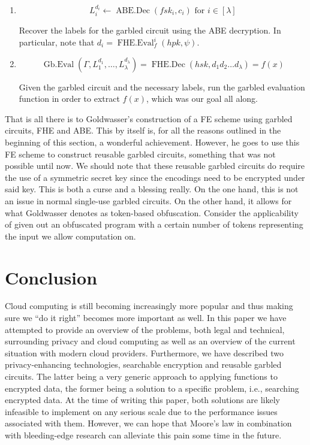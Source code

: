 \documentclass[11pt, a4paper]{article}
\newcommand{\op}[1]{\operatorname{#1}}
\begin{document}
\begin{enumerate}
    \item
        \[
            L_i^{d_i} \gets \op{ABE.Dec}(fsk_i, c_i) \text{ for } i \in [\lambda]
        \]

        Recover the labels for the garbled circuit using the ABE decryption. In particular, note that $d_i = \op{FHE.Eval}_f^i(hpk, \psi)$.
    \item
        \[
            \op{Gb.Eval}(\Gamma, L_1^{d_1}, \dots, L_{\lambda}^{d_{\lambda}}) = \op{FHE.Dec}(hsk, d_1 d_2 \dots d_{\lambda}) = f(x)
        \]

        Given the garbled circuit and the necessary labels, run the garbled evaluation function in order to extract $f(x)$, which was our goal all along.
\end{enumerate}

That is all there is to Goldwasser's construction of a FE scheme using garbled circuits, FHE and ABE. 
This by itself is, for all the reasons outlined in the beginning of this section, a wonderful achievement. 
However, he goes to use this FE scheme to construct reusable garbled circuits, something that was not possible until now.
We should note that these reusable garbled circuits do require the use of a symmetric secret key since the encodings need to be encrypted under said key.
This is both a curse and a blessing really.
On the one hand, this is not an issue in normal single-use garbled circuits.
On the other hand, it allows for what Goldwasser denotes as token-based obfuscation.
Consider the applicability of given out an obfuscated program with a certain number of tokens representing the input we allow computation on.

\section{Conclusion}
\label{sec:conclusion}

Cloud computing is still becoming increasingly more popular and thus making sure we ``do it right'' becomes more important as well.
In this paper we have attempted to provide an overview of the problems, both legal and technical, surrounding privacy and cloud computing as well as an overview of the current situation with modern cloud providers.
Furthermore, we have described two privacy-enhancing technologies, searchable encryption and reusable garbled circuits.
The latter being a very generic approach to applying functions to encrypted data, the former being a solution to a specific problem, i.e., searching encrypted data.
At the time of writing this paper, both solutions are likely infeasible to implement on any serious scale due to the performance issues associated with them.
However, we can hope that Moore's law in combination with bleeding-edge research can alleviate this pain some time in the future.
\end{document}
